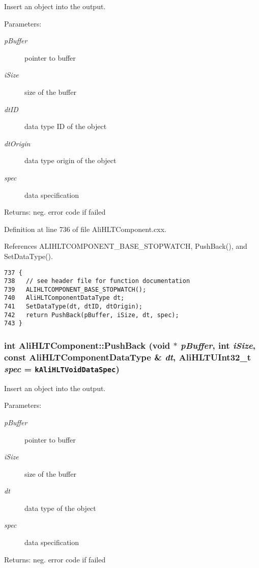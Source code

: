 Insert an object into the output. \begin{Desc}
\item[Parameters:]
\begin{description}
\item[{\em p\-Buffer}]pointer to buffer \item[{\em i\-Size}]size of the buffer \item[{\em dt\-ID}]data type ID of the object \item[{\em dt\-Origin}]data type origin of the object \item[{\em spec}]data specification \end{description}
\end{Desc}
\begin{Desc}
\item[Returns:]neg. error code if failed \end{Desc}


Definition at line 736 of file Ali\-HLTComponent.cxx.

References ALIHLTCOMPONENT\_\-BASE\_\-STOPWATCH, Push\-Back(), and Set\-Data\-Type().

\footnotesize\begin{verbatim}737 {
738   // see header file for function documentation
739   ALIHLTCOMPONENT_BASE_STOPWATCH();
740   AliHLTComponentDataType dt;
741   SetDataType(dt, dtID, dtOrigin);
742   return PushBack(pBuffer, iSize, dt, spec);
743 }
\end{verbatim}\normalsize 


\subsubsection{\setlength{\rightskip}{0pt plus 5cm}int Ali\-HLTComponent::Push\-Back (void $\ast$ {\em p\-Buffer}, int {\em i\-Size}, const {\bf Ali\-HLTComponent\-Data\-Type} \& {\em dt}, {\bf Ali\-HLTUInt32\_\-t} {\em spec} = {\tt {\bf k\-Ali\-HLTVoid\-Data\-Spec}})\hspace{0.3cm}{\tt  [protected]}}\label{classAliHLTComponent_b25}


Insert an object into the output. \begin{Desc}
\item[Parameters:]
\begin{description}
\item[{\em p\-Buffer}]pointer to buffer \item[{\em i\-Size}]size of the buffer \item[{\em dt}]data type of the object \item[{\em spec}]data specification \end{description}
\end{Desc}
\begin{Desc}
\item[Returns:]neg. error code if failed \end{Desc}


